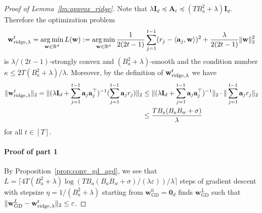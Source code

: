 \documentclass[10pt]{article}
\newcommand{\id}{\bI}
\newcommand{\eps}{\varepsilon}
\DeclareMathOperator*{\argmin}{arg\,min}
\newcommand{\<}{\left\langle}
\renewcommand{\>}{\right\rangle}
\newcommand{\bzero}{{\mathbf 0}}
\newcommand{\ridge}{{\rm ridge}}
\newcommand{\R}{\mathbb{R}}
\newcommand{\GD}{{\mathrm{GD}}}
\def\bA{{\mathbf A}}
\def\bI{{\mathbf I}}
\def\ba{{\mathbf a}}
\def\bw{{\mathbf w}}
\begin{document}
\begin{proof}[Proof of Lemma~\ref{lm:approx_ridge}]

Note that $\lambda\id_d\preceq \bA_t\preceq (TB_a^2+\lambda)\id_d$. Therefore the optimization problem
$$\bw^t_{\ridge,\lambda}=\argmin_{\bw\in\R^d}L(\bw):=\argmin_{\bw\in\R^d}\frac{1}{2(2t-1)}\sum_{j=1}^{t-1}(r_j-\<\ba_j,\bw\>)^2+\frac{\lambda}{2(2t-1)}\|\bw\|_2^2$$
is $\lambda/(2t-1)$-strongly convex  and $(B_a^2+\lambda)$-smooth and the condition number $\kappa\leq 2T(B_a^2+\lambda)/\lambda$. Moreover, by the definition of $\bw_{\ridge,\lambda}^t$ we have
\begin{align*}
    \|\bw^t_{\ridge,\lambda}\|_2=\|(\lambda\id_d+\sum_{j=1}^{t-1}\ba_j\ba_j^\top)^{-1}(\sum_{j=1}^{t-1}\ba_jr_j)\|_2&\leq
    \|(\lambda\id_d+\sum_{j=1}^{t-1}\ba_j\ba_j^\top)^{-1}\|_2\cdot\|\sum_{j=1}^{t-1}\ba_jr_j\|_2\\&\leq
    \frac{TB_a(B_aB_w+\sigma)}{\lambda}
\end{align*}
for all $t\in[T]$.
\paragraph{Proof of part 1}
By Proposition~\ref{prop:conv_gd_agd}, we see that $L=\lceil4T(B_a^2+\lambda)\log({TB_a(B_aB_w+\sigma)}/({\lambda}\eps))/\lambda\rceil$ steps of gradient descent with stepsize $\eta=1/(B_a^2+\lambda)$ starting from $\bw_{\GD}^0=\bzero_d$ finds $\bw^L_\GD$ such that $\|\bw^L_{\GD}-\bw^t_{\ridge,\lambda}\|_2\leq\eps$.


\end{proof}
\end{document}
